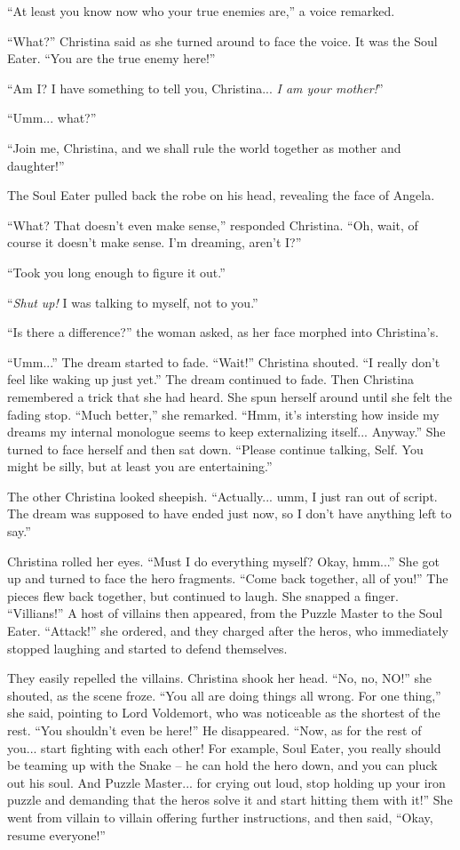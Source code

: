 \documentclass[showtrims,b6paper,draft,10pt]{memoir}
\begin{document}
``At least you know now who your true enemies are,'' a voice remarked.

``What?'' Christina said as she turned around to face the voice.  It was the Soul Eater.  ``You are the true enemy here!''

``Am I?  I have something to tell you, Christina... \emph{I am your mother!}''

``Umm... what?''

``Join me, Christina, and we shall rule the world together as mother and daughter!''

The Soul Eater pulled back the robe on his head, revealing the face of Angela.

``What?  That doesn't even make sense,'' responded Christina.  ``Oh, wait, of course it doesn't make sense.  I'm dreaming, aren't I?''

``Took you long enough to figure it out.''

``\emph{Shut up!}  I was talking to myself, not to you.''

``Is there a difference?''  the woman asked, as her face morphed into Christina's.

``Umm...''  The dream started to fade.  ``Wait!'' Christina shouted.  ``I really don't feel like waking up just yet.''  The dream continued to fade.  Then Christina remembered a trick that she had heard.  She spun herself around until she felt the fading stop. ``Much better,'' she remarked.  ``Hmm, it's intersting how inside my dreams my internal monologue seems to keep externalizing itself...  Anyway.''  She turned to face herself and then sat down.  ``Please continue talking, Self.  You might be silly, but at least you are entertaining.''

The other Christina looked sheepish.  ``Actually... umm, I just ran out of script.  The dream was supposed to have ended just now, so I don't have anything left to say.''

Christina rolled her eyes.  ``Must I do everything myself?  Okay, hmm...''  She got up and turned to face the hero fragments.  ``Come back together, all of you!''  The pieces flew back together, but continued to laugh.   She snapped a finger.  ``Villians!''  A host of villains then appeared, from the Puzzle Master to the Soul Eater.  ``Attack!''  she ordered, and they charged after the heros, who immediately stopped laughing and started to defend themselves.

They easily repelled the villains.  Christina shook her head.  ``No, no, NO!'' she shouted, as the scene froze.  ``You all are doing things all wrong.  For one thing,'' she said, pointing to Lord Voldemort, who was noticeable as the shortest of the rest.  ``You shouldn't even be here!''  He disappeared.  ``Now, as for the rest of you... start fighting with each other!  For example, Soul Eater, you really should be teaming up with the Snake -- he can hold the hero down, and you can pluck out his soul.  And Puzzle Master... for crying out loud, stop holding up your iron puzzle and demanding that the heros solve it and start hitting them with it!''  She went from villain to villain offering further instructions, and then said,  ``Okay, resume everyone!''
\end{document}
